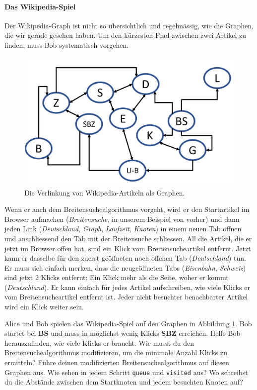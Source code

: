 \paragraph{Das Wikipedia-Spiel}
Der Wikipedia-Graph ist nicht so übersichtlich und regelmässig, wie die Graphen, die wir gerade gesehen haben. Um den kürzesten Pfad zwischen zwei Artikel zu finden, muss Bob systematisch vorgehen. 
\begin{figure}[h]
    \centering
    \includegraphics[width=\textwidth]{Pictures/Wikipedia.PNG} 
    \caption{Die Verlinkung von Wikipedia-Artikeln als Graphen.}
    \label{fig:wikipedia_graph}
\end{figure}

Wenn er anch dem Breitensuchealgorithmus vorgeht, wird er den Startartikel im Browser aufmachen (\textit{Breitensuche}, in unserem Beispiel von vorher) und dann jeden Link (\textit{Deutschland}, \textit{Graph}, \textit{Laufzeit}, \textit{Knoten}) in einem neuen Tab öffnen und anschliessend den Tab mit der Breitensuche schliessen. All die Artikel, die er jetzt im Browser offen hat, sind ein Klick vom Breitensucheartikel entfernt. Jetzt kann er dasselbe für den zuerst geöffneten noch offenen Tab (\textit{Deutschland}) tun. Er muss sich einfach merken, dass die neugeöffneten Tabs (\textit{Eisenbahn}, \textit{Schweiz}) sind jetzt 2 Klicks entfernt: Ein Klick mehr als die Seite, woher er kommt (\textit{Deutschland}). Er kann einfach für jedes Artikel aufschreiben, wie viele Klicks er vom Breitensucheartikel entfernt ist. Jeder nicht besuchter benachbarter Artikel wird ein Klick weiter sein.

\begin{aufgabe}\label{aufgabe_wikipedia_spiel}
Alice und Bob spielen das Wikipedia-Spiel auf den Graphen in Abbildung \ref{fig:wikipedia_graph}. Bob startet bei \textbf{BS} und muss in möglichst wenig Klicks \textbf{SBZ} erreichen. Helfe Bob herauszufinden, wie viele Klicks er braucht. Wie musst du den Breitensuchealgorithmus modifizieren, um die minimale Anzahl Klicks zu ermitteln? Führe deinen modifizierten Breitensuchealgorithmus auf diesen Graphen aus. Wie sehen in jedem Schritt \texttt{queue} und \texttt{visited} aus? Wo schreibst du die Abstände zwischen dem Startknoten und jedem besuchten Knoten auf?
\end{aufgabe}

